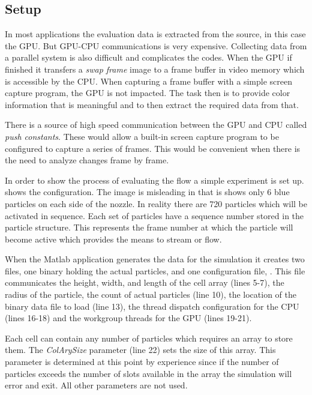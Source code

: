 
\subsection{Setup} \label{eval}


In most applications the evaluation data is extracted from the source, in this case the GPU. But GPU-CPU communications is very expensive. Collecting data from a parallel system is also difficult and complicates the codes. When the GPU if finished it transfers a \textit{swap frame} image to a frame buffer in video memory which is accessible by the CPU. When capturing a frame buffer with a simple screen capture program, the GPU is not impacted. The task then is to provide color information that is meaningful and to then extract the required data from that.



There is a source of high speed communication between the GPU and CPU called \textit{push constants}. These would allow a built-in screen capture program to be configured to capture a series of frames. This would be convenient when there is the need to analyze changes frame by frame.



In order to show the process of evaluating the flow a simple experiment is set up.  shows the configuration. The image is misleading in that is shows only 6  blue particles on each side of the nozzle. In reality there are 720 particles which will be activated in sequence. Each set of particles have a sequence number stored in the particle structure. This represents the frame number at which the particle will become active which provides the means to stream or flow.



When the Matlab application generates the data for the simulation it creates two files, one binary holding the actual particles, and one configuration file, . This file communicates the height, width, and length of the cell array (lines 5-7), the radius of the particle, the count of actual particles (line 10), the location of the binary data file to load (line 13), the thread dispatch configuration for the CPU (lines 16-18) and the workgroup threads for the GPU (lines 19-21). 



Each cell can contain any number of particles which requires an array to store them. The \textit{ColArySize} parameter (line 22) sets the size of this array. This parameter is determined at this point by experience since if the number of particles exceeds the number of slots available in the array the simulation will error and exit. All other parameters are not used.

